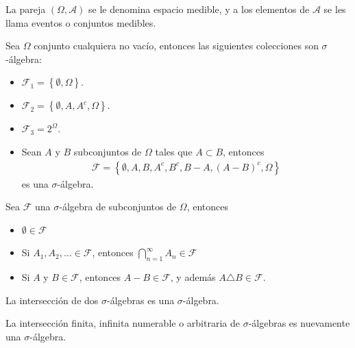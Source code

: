 \begin{Def}
La pareja $\left(\Omega,\mathcal{A}\right)$ se le denomina espacio medible, y a los elementos de $\mathcal{A}$ se les llama eventos o conjuntos medibles.
\end{Def}

\begin{Ejem}
Sea $\Omega$ conjunto cualquiera no vac\'io, entonces las siguientes colecciones son $\sigma$-\'algebra:

\begin{itemize}
\item[i) ] $\mathcal{F}_{1}=\left\{\emptyset,\Omega\right\}$.
\item[ii) ] $\mathcal{F}_{2}=\left\{\emptyset,A,A^{c},\Omega\right\}$.
\item[iii) ]$\mathcal{F}_{3}=2^{\Omega}$.
\item[iv) ] Sean $A$ y $B$ subconjuntos de $\Omega$ tales que $A\subset B$, entonces 
\begin{eqnarray*}
\mathcal{F}=\left\{\emptyset,A,B,A^{c},B^{c},B-A,\left(A-B\right)^{c},\Omega\right\}
\end{eqnarray*}
 es una $\sigma$-\'algebra.
\end{itemize}
\end{Ejem}


\begin{Prop} Sea $\mathcal{F}$ una $\sigma$-\'algebra de subconjuntos de $\Omega$, entonces
\begin{itemize}
\item[i) ] $\emptyset\in\mathcal{F}$

\item[ii) ] Si $A_{1},A_{2},\dots\in\mathcal{F}$, entonces $\bigcap_{n=1}^{\infty}A_{n}\in\mathcal{F}$

\item[iii) ] Si $A$ y $B\in\mathcal{F}$, entonces $A-B\in\mathcal{F}$, y adem\'as $A\triangle B\in\mathcal{F}$.
\end{itemize}
\end{Prop}

\begin{Prop}
La intersecci\'on de dos $\sigma$-\'algebras es una $\sigma$-\'algebra.
\end{Prop}

\begin{Prop}
La intersecci\'on finita, infinita numerable o arbitraria de $\sigma$-\'algebras es nuevamente una $\sigma$-\'algebra.
\end{Prop}

